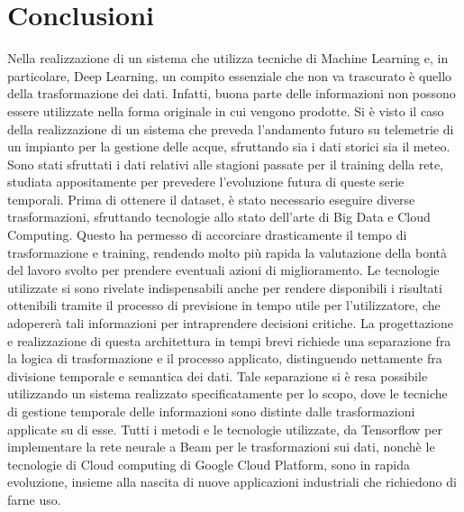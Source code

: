 \chapter*{Conclusioni}\label{conclusioni}
Nella realizzazione di un sistema che utilizza tecniche di Machine Learning e, in particolare, Deep Learning, un compito essenziale che non va trascurato è quello della trasformazione dei dati. Infatti, buona parte delle informazioni non possono essere utilizzate nella forma originale in cui vengono prodotte. Si è visto il caso della realizzazione di un sistema che preveda l'andamento futuro su telemetrie di un impianto per la gestione delle acque, sfruttando sia i dati storici sia il meteo. Sono stati sfruttati i dati relativi alle stagioni passate per il training della rete, studiata appositamente per prevedere l'evoluzione futura di queste serie temporali. Prima di ottenere il dataset, è stato necessario eseguire diverse trasformazioni, sfruttando tecnologie allo stato dell'arte di Big Data e Cloud Computing. Questo ha permesso di accorciare drasticamente il tempo di trasformazione e training, rendendo molto più rapida la valutazione della bontà del lavoro svolto per prendere eventuali azioni di miglioramento. Le tecnologie utilizzate si sono rivelate indispensabili anche per rendere disponibili i risultati ottenibili tramite il processo di previsione in tempo utile per l'utilizzatore, che adopererà tali informazioni per intraprendere decisioni critiche. La progettazione e realizzazione di questa architettura in tempi brevi richiede una separazione fra la logica di trasformazione e il processo applicato, distinguendo nettamente fra divisione temporale e semantica dei dati. Tale separazione si è resa possibile utilizzando un sistema realizzato specificatamente per lo scopo, dove le tecniche di gestione temporale delle informazioni sono distinte dalle trasformazioni applicate su di esse. Tutti i metodi e le tecnologie utilizzate, da Tensorflow per implementare la rete neurale a Beam per le trasformazioni sui dati, nonchè le tecnologie di Cloud computing di Google Cloud Platform, sono in rapida evoluzione, insieme alla nascita di nuove applicazioni industriali che richiedono di farne uso. %